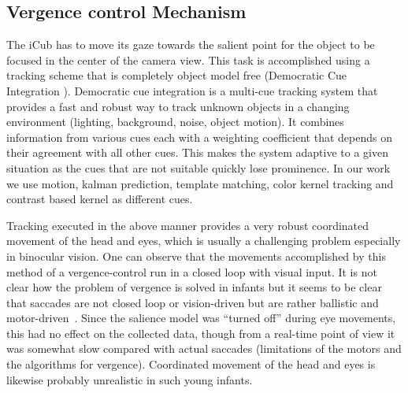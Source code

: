 \documentclass[conference]{IEEEtran}
\begin{document}
\subsection{Vergence control Mechanism}
The iCub has to move its gaze towards the salient point for the object
to be focused in the center of the camera view. This task is
accomplished using a tracking scheme that is completely object model
free (Democratic Cue Integration \cite{triesch2001}). Democratic cue
integration is a multi-cue tracking system that provides a fast and
robust way to track unknown objects in a changing environment
(lighting, background, noise, object motion). It combines information
from various cues each with a weighting coefficient that depends on
their agreement with all other cues. This makes the system adaptive to
a given situation as the cues that are not suitable quickly lose
prominence. In our work we use motion, kalman prediction, template
matching, color kernel tracking and contrast based kernel as different
cues. 

Tracking executed in the above manner provides a very robust
coordinated movement of the head and eyes, which is usually a
challenging problem especially in binocular vision. One can observe
that the movements accomplished by this method of a vergence-control
run in a closed loop with visual input. It is not clear how the
problem of vergence is solved in infants but it seems to be clear that
saccades are not closed loop or vision-driven but are rather ballistic
and motor-driven~\cite{hainline_1998}. Since the salience model was
``turned off'' during eye movements, this had no effect on the
collected data, though from a real-time point of view it was somewhat
slow compared with actual saccades (limitations of the motors and the
algorithms for vergence). Coordinated movement of the head and eyes is
likewise probably unrealistic in such young infants.
\end{document}
